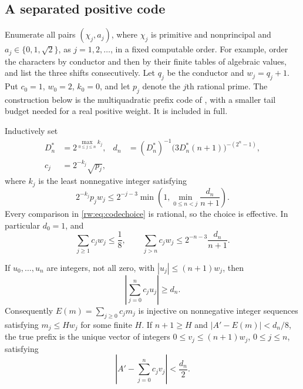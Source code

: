 \subsection{A separated positive code}

Enumerate all pairs $(\chi_j,a_j)$, where $\chi_j$ is primitive and
nonprincipal and $a_j\in\{0,1,\sqrt2\}$, as $j=1,2,\ldots$, in a fixed
computable order. For example, order the characters by conductor and then
by their finite tables of algebraic values, and list the three shifts
consecutively. Let $q_j$ be the conductor and $w_j=q_j+1$. Put $c_0=1$,
$w_0=2$, $k_0=0$, and let $p_j$ denote the $j$th rational prime.
The construction below is the multiquadratic prefix code of
\cite[lemma ``Prefix separation'']{ProveItArticle}, with a smaller tail
budget needed for a real positive weight. It is included in full.

Inductively set
\begin{align}
 D_n^*&=2^{\max_{0\le j\le n}k_j},&
 d_n&=(D_n^*)^{-1}
       \bigl(3D_n^*(n+1)\bigr)^{-(2^n-1)},\label{rw:eq:dn}\\
 c_j&=2^{-k_j}\sqrt{p_j},\label{rw:eq:cj}
\end{align}
where $k_j$ is the least nonnegative integer satisfying
\begin{equation}\label{rw:eq:codechoice}
 2^{-k_j}p_jw_j\le
 2^{-j-3}\min\left(1,\min_{0\le n<j}\frac{d_n}{n+1}\right).
\end{equation}
Every comparison in \eqref{rw:eq:codechoice} is rational, so the choice is
effective. In particular $d_0=1$, and
\begin{equation}\label{rw:eq:tails}
 \sum_{j\ge1}c_jw_j\le\frac18,\qquad
 \sum_{j>n}c_jw_j\le
 2^{-n-3}\frac{d_n}{n+1}.
\end{equation}

\begin{lemma}\label{rw:lem:code}
If $u_0,\ldots,u_n$ are integers, not all zero, with
$|u_j|\le(n+1)w_j$, then
\[
 \left|\sum_{j=0}^n c_ju_j\right|\ge d_n.
\]
Consequently $E(m)=\sum_{j\ge0}c_jm_j$ is injective on nonnegative integer
sequences satisfying $m_j\le H w_j$ for some finite $H$.
If $n+1\ge H$ and $|A'-E(m)|<d_n/8$, the true prefix is the unique vector
of integers $0\le v_j\le(n+1)w_j$, $0\le j\le n$, satisfying
\[
 \left|A'-\sum_{j=0}^n c_jv_j\right|<\frac{d_n}{2}.
\]
\end{lemma}


